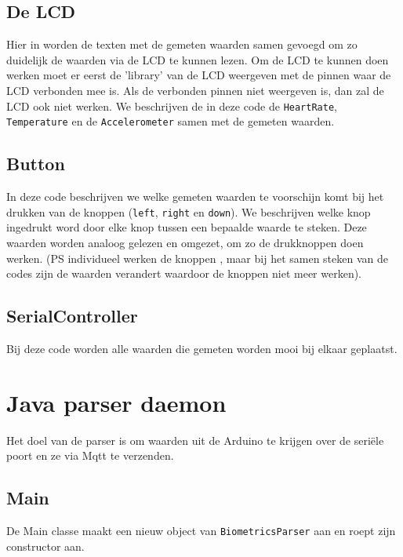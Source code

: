\documentclass[a4paper]{report}
\newcommand{\code}[1]{\colorbox{light-gray}{\texttt{#1}}}
\begin{document}
            \subsection{De LCD}
                Hier in worden de texten met de gemeten waarden samen gevoegd om zo duidelijk de waarden via de LCD \cite{lcd1} te kunnen lezen.
                Om de LCD \cite{lcd1} te kunnen doen werken moet er eerst de 'library' van de LCD \cite{lcd1} weergeven met de pinnen waar de LCD \cite{lcd1} verbonden mee is.
                Als de verbonden pinnen niet weergeven is, dan zal de LCD \cite{lcd1} ook niet werken.
                We beschrijven de in deze code de \code{HeartRate}, \code{Temperature} en de \code{Accelerometer} samen met de gemeten waarden.
                
            \subsection{Button}
                In deze code beschrijven we welke gemeten waarden te voorschijn komt bij het drukken van de knoppen \cite{lcd1} (\code{left}, \code{right} en \code{down}).
                We beschrijven welke knop \cite{lcd1} ingedrukt word door elke knop tussen een bepaalde waarde te steken.
                Deze waarden worden analoog gelezen en omgezet, om zo de drukknoppen \cite{lcd1} doen werken.
                (PS individueel werken de knoppen \cite{lcd1}, maar bij het samen steken van de codes zijn de waarden verandert waardoor de knoppen niet meer werken).
                
            \subsection{SerialController}
                Bij deze code worden alle waarden die gemeten worden mooi bij elkaar geplaatst.
                
    \section{Java parser daemon}
        Het doel van de parser is om waarden uit de Arduino te krijgen over de seri\"ele poort en ze via Mqtt te verzenden.

        \subsection{Main}
            De Main classe maakt een nieuw object van \code{BiometricsParser} aan en roept zijn constructor aan.
\end{document}
